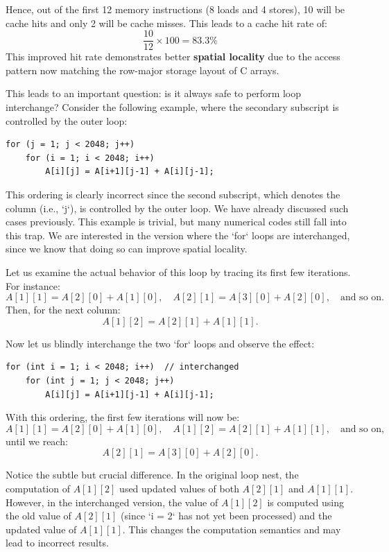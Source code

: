 \documentclass[12pt]{book}
\begin{document}
Hence, out of the first 12 memory instructions (8 loads and 4 stores), 10 will be cache hits and only 2 will be cache misses. This leads to a cache hit rate of:
\[
\frac{10}{12} \times 100 = 83.3\%
\]
This improved hit rate demonstrates better \textbf{spatial locality} due to the access pattern now matching the row-major storage layout of C arrays.

This leads to an important question: is it always safe to perform loop interchange? Consider the following example, where the secondary subscript is controlled by the outer loop:

\begin{lstlisting}
for (j = 1; j < 2048; j++)
    for (i = 1; i < 2048; i++)
        A[i][j] = A[i+1][j-1] + A[i][j-1];
\end{lstlisting}

This ordering is clearly incorrect since the second subscript, which denotes the column (i.e., `j`), is controlled by the outer loop. We have already discussed such cases previously. This example is trivial, but many numerical codes still fall into this trap. We are interested in the version where the `for` loops are interchanged, since we know that doing so can improve spatial locality.

Let us examine the actual behavior of this loop by tracing its first few iterations. For instance:
\[
A[1][1] = A[2][0] + A[1][0], \quad A[2][1] = A[3][0] + A[2][0], \quad \text{and so on}.
\]
Then, for the next column:
\[
A[1][2] = A[2][1] + A[1][1].
\]

Now let us blindly interchange the two `for` loops and observe the effect:

\begin{lstlisting}
for (int i = 1; i < 2048; i++)  // interchanged
    for (int j = 1; j < 2048; j++)
        A[i][j] = A[i+1][j-1] + A[i][j-1];
\end{lstlisting}


With this ordering, the first few iterations will now be:
\[
A[1][1] = A[2][0] + A[1][0], \quad A[1][2] = A[2][1] + A[1][1], \quad \text{and so on,}
\]
until we reach:
\[
A[2][1] = A[3][0] + A[2][0].
\]

Notice the subtle but crucial difference. In the original loop nest, the computation of $A[1][2]$ used updated values of both $A[2][1]$ and $A[1][1]$. However, in the interchanged version, the value of $A[1][2]$ is computed using the old value of $A[2][1]$ (since `i = 2` has not yet been processed) and the updated value of $A[1][1]$. This changes the computation semantics and may lead to incorrect results.
\end{document}
